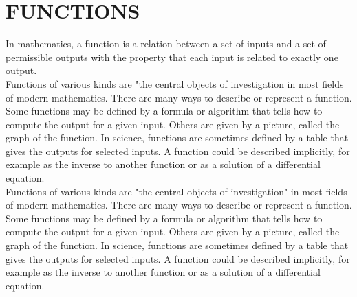 \documentclass[float=false,crop=false]{standalone}
\begin{document}
\section*{FUNCTIONS}
In mathematics, a function\cite{wiki} is a relation between a set of inputs and a set of permissible outputs with the property that each input is related to exactly one output. \\
Functions of various kinds are "the central objects of investigation in most fields of modern mathematics. There are many ways to describe or represent a function. Some functions may be defined by a formula or algorithm that tells how to compute the output for a given input. Others are given by a picture, called the graph of the function. In science, functions are sometimes defined by a table that gives the outputs for selected inputs. A function could be described implicitly, for example as the inverse to another function or as a solution of a differential equation.\\
Functions of various kinds are "the central objects of investigation" in most fields of modern mathematics. There are many ways to describe or represent a function. Some functions may be defined by a formula or algorithm that tells how to compute the output for a given input. Others are given by a picture, called the graph of the function. In science, functions are sometimes defined by a table that gives the outputs for selected inputs. A function could be described implicitly, for example as the inverse to another function or as a solution of a differential equation.\\
\end{document}
